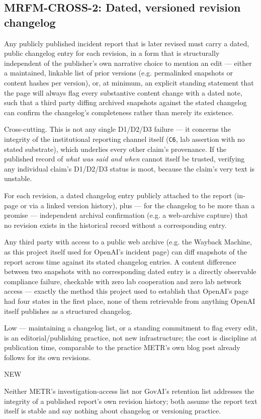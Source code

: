 \subsection*{MRFM-CROSS-2: Dated, versioned revision changelog}
\begin{description}[leftmargin=2.2cm, style=nextline]
\item[Requirement] Any publicly published incident report that is later revised must carry a dated, public changelog entry for each revision, in a form that is structurally independent of the publisher's own narrative choice to mention an edit --- either a maintained, linkable list of prior versions (e.g. permalinked snapshots or content hashes per version), or, at minimum, an explicit standing statement that the page will always flag every substantive content change with a dated note, such that a third party diffing archived snapshots against the stated changelog can confirm the changelog's completeness rather than merely its existence.
\item[Degradation defended] Cross-cutting. This is not any single D1/D2/D3 failure --- it concerns the integrity of the institutional reporting channel itself (\texttt{C6}, lab assertion with no stated substrate), which underlies every other claim's provenance. If the published record of \emph{what was said and when} cannot itself be trusted, verifying any individual claim's D1/D2/D3 status is moot, because the claim's very text is unstable.
\item[Evidence required] For each revision, a dated changelog entry publicly attached to the report (in-page or via a linked version history), plus --- for the changelog to be more than a promise --- independent archival confirmation (e.g. a web-archive capture) that no revision exists in the historical record without a corresponding entry.
\item[Verifier (no lab network access needed)] Any third party with access to a public web archive (e.g. the Wayback Machine, as this project itself used for OpenAI's incident page) can diff snapshots of the report across time against its stated changelog entries. A content difference between two snapshots with no corresponding dated entry is a directly observable compliance failure, checkable with zero lab cooperation and zero lab network access --- exactly the method this project used to establish that OpenAI's page had four states in the first place, none of them retrievable from anything OpenAI itself publishes as a structured changelog.
\item[Cost band] Low --- maintaining a changelog list, or a standing commitment to flag every edit, is an editorial/publishing practice, not new infrastructure; the cost is discipline at publication time, comparable to the practice METR's own blog post already follows for its own revisions.
\item[vs. prior art] NEW
\item[Prior-art note] Neither METR's investigation-access list nor GovAI's retention list addresses the integrity of a published report's own revision history; both assume the report text itself is stable and say nothing about changelog or versioning practice.
\end{description}

